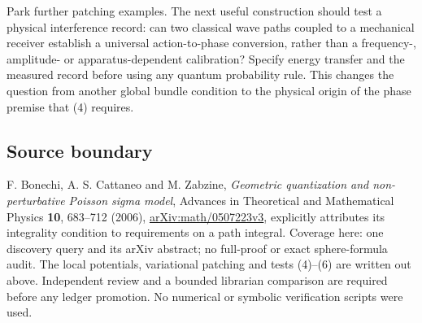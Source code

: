 \documentclass[11pt,a4paper]{article}
\begin{document}
Park further patching examples. The next useful construction should test
a physical interference record: can two classical wave paths coupled to
a mechanical receiver establish a universal action-to-phase conversion,
rather than a frequency-, amplitude- or apparatus-dependent calibration?
Specify energy transfer and the measured record before using any quantum
probability rule. This changes the question from another global bundle
condition to the physical origin of the phase premise that (4) requires.

\hypertarget{source-boundary}{%
\subsection{Source boundary}\label{source-boundary}}

F. Bonechi, A. S. Cattaneo and M. Zabzine, \emph{Geometric quantization
and non-perturbative Poisson sigma model}, Advances in Theoretical and
Mathematical Physics \textbf{10}, 683--712 (2006),
\href{https://arxiv.org/abs/math/0507223v3}{arXiv:math/0507223v3},
explicitly attributes its integrality condition to requirements on a
path integral. Coverage here: one discovery query and its arXiv
abstract; no full-proof or exact sphere-formula audit. The local
potentials, variational patching and tests (4)--(6) are written out
above. Independent review and a bounded librarian comparison are
required before any ledger promotion. No numerical or symbolic
verification scripts were used.
\end{document}
